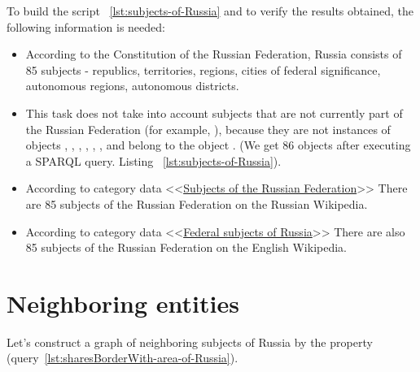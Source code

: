 
To build the script ~\protect\ref{lst:subjects-of-Russia} and to verify the results obtained, the following information is needed:
\begin{itemize}
\item According to the Constitution of the Russian Federation, Russia consists of 85 subjects - republics, territories, regions, cities of federal significance, autonomous regions, autonomous districts.
  \item This task does not take into account subjects that are not currently part of the Russian Federation (for example, ), because they are not instances of objects , , , , , , and belong to the object . (We get 86 objects after executing a SPARQL query. Listing ~\protect\ref{lst:subjects-of-Russia}). 
  \item According to category data <<\href{https://ru.wikipedia.org/wiki/Subjects of the Russian Federation}{Subjects of the Russian Federation}>> There are 85 subjects of the Russian Federation on the Russian Wikipedia.
  \item According to category data <<\href{https://ru.wikipedia.org/wiki/en:Federal_subjects_of_Russia}{Federal subjects of Russia}>> There are also 85 subjects of the Russian Federation on the English Wikipedia.
\end{itemize}

\section{Neighboring entities}

Let's construct a graph of neighboring subjects of Russia by the property  (query~\protect\ref{lst:sharesBorderWith-area-of-Russia}).

\label{question:q_subjects_of_Russia_1}

